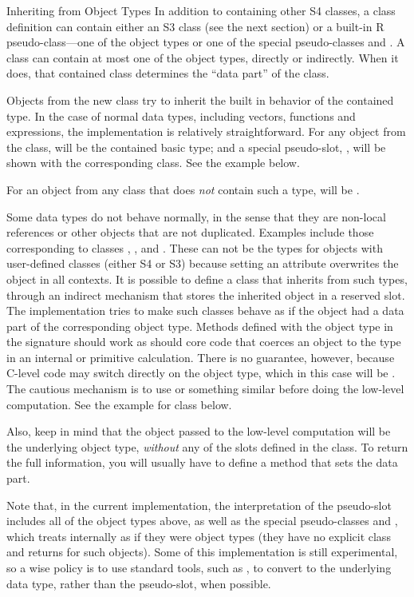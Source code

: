 %
\begin{Section}{Inheriting from Object Types}
In addition to containing other S4 classes, a class definition can
contain either an S3 class (see the next section) or a built-in R pseudo-class---one
of the \R{}
object types or one of the special \R{} pseudo-classes  and
.
A class can contain at most one of the object types, directly or indirectly.
When it does, that contained class determines the ``data part''
of the class.

Objects from the new class try to inherit the built in
behavior of the contained type.
In the case of normal \R{} data types, including vectors, functions and
expressions, the implementation is relatively straightforward.
For any object  from the class,
 will be the contained basic type; and a special
pseudo-slot, , will be shown with the corresponding class.
See the  example below.

For an object from any class that does \emph{not} contain such a type,
 will be .

Some \R{} data types do not behave normally, in the sense that they are
non-local references or other objects that are not duplicated.
Examples include those corresponding to classes , , and .
These can not be the types for objects with user-defined
classes (either S4 or S3) because setting an attribute overwrites the
object in all contexts.
It is possible to define a class that inherits from such types,
through an indirect mechanism that stores the inherited object in a
reserved slot.
The implementation tries to make such classes behave as if the object
had a data part of the corresponding object type.
Methods defined with the object type in the signature should work as
should core code that coerces an object to the type in an internal or
primitive calculation.
There is no guarantee, however, because C-level code may switch
directly on the object type, which in this case will be .
The cautious mechanism is to use  or
something similar before doing the low-level computation.  See the
example for class  below.

Also, keep in mind that the object passed to the low-level computation
will be the underlying object type, \emph{without} any of the slots
defined in the class.
To return the full information, you will usually have to define a
method that sets the data part.

Note that, in the current implementation, the interpretation of the
 pseudo-slot includes all of the object types above, as
well as the special pseudo-classes  and
, which \R{} treats internally as if they were object types
(they have no explicit class and  returns
 for such objects).
Some of this implementation is still experimental, so a wise policy is
to use standard tools, such as , to convert to
the underlying data type, rather than the pseudo-slot, when possible.

\end{Section}
